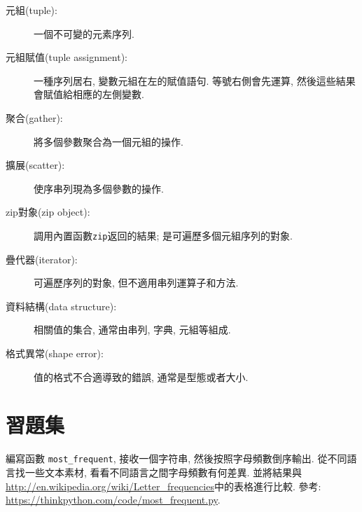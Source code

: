\documentclass[10pt]{book}
\begin{document}
\begin{description}

\item[元組(tuple):] 一個不可變的元素序列. 

\item[元組賦值(tuple assignment):] 一種序列居右, 變數元組在左的賦值語句. 
等號右側會先運算, 然後這些結果會賦值給相應的左側變數. 

\item[聚合(gather):] 將多個參數聚合為一個元組的操作.

\item[擴展(scatter):] 使序串列現為多個參數的操作. 

\item[zip對象(zip object):] 調用內置函數{\tt zip}返回的結果;
是可遍歷多個元組序列的對象. 

\item[疊代器(iterator):] 可遍歷序列的對象, 但不適用串列運算子和方法. 

\item[資料結構(data structure):] 相關值的集合, 通常由串列, 字典, 元組等組成. 

\item[格式異常(shape error):] 值的格式不合適導致的錯誤, 通常是型態或者大小. 

\end{description}


\section{習題集}

\begin{exercise}

編寫函數 \verb"most_frequent", 接收一個字符串, 然後按照字母頻數倒序輸出. 
從不同語言找一些文本素材, 看看不同語言之間字母頻數有何差異. 
並將結果與\url{http://en.wikipedia.org/wiki/Letter_frequencies}中的表格進行比較. 
參考:
\url{https://thinkpython.com/code/most_frequent.py}.  

\end{exercise}
\end{document}
